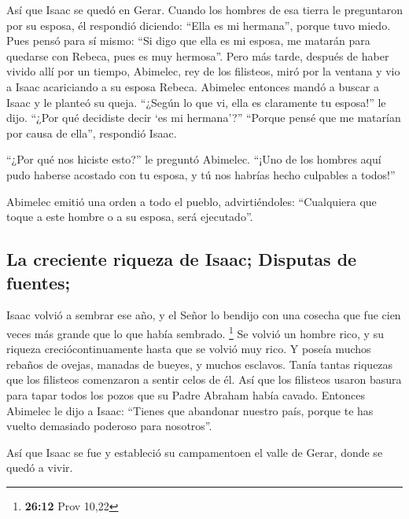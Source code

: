  Así que Isaac se quedó en Gerar.  Cuando
los hombres de esa tierra le preguntaron por su esposa, él respondió
diciendo: ``Ella es mi hermana'', porque tuvo miedo. Pues pensó para sí
mismo: ``Si digo que ella es mi esposa, me matarán para quedarse con
Rebeca, pues es muy hermosa''.  Pero más tarde, después de
haber vivido allí por un tiempo, Abimelec, rey de los filisteos, miró
por la ventana y vio a Isaac acariciando a su esposa Rebeca.
 Abimelec entonces mandó a buscar a Isaac y le planteó su
queja. ``¿Según lo que vi, ella es claramente tu esposa!'' le dijo.
``¿Por qué decidiste decir `es mi hermana'?'' ``Porque pensé que me
matarían por causa de ella'', respondió Isaac.

 ``¿Por qué nos hiciste esto?'' le preguntó Abimelec.
``¡Uno de los hombres aquí pudo haberse acostado con tu esposa, y tú nos
habrías hecho culpables a todos!''

 Abimelec emitió una orden a todo el pueblo,
advirtiéndoles: ``Cualquiera que toque a este hombre o a su esposa, será
ejecutado''.

\hypertarget{la-creciente-riqueza-de-isaac-disputas-de-fuentes}{%
\subsection{La creciente riqueza de Isaac; Disputas de
fuentes;}\label{la-creciente-riqueza-de-isaac-disputas-de-fuentes}}

 Isaac volvió a sembrar ese año, y el Señor lo bendijo
con una cosecha que fue cien veces más grande que lo que había sembrado.
\footnote{\textbf{26:12} Prov 10,22}  Se volvió un hombre
rico, y su riqueza creciócontinuamente hasta que se volvió muy rico.
 Y poseía muchos rebaños de ovejas, manadas de bueyes, y
muchos esclavos. Tanía tantas riquezas que los filisteos comenzaron a
sentir celos de él.  Así que los filisteos usaron basura
para tapar todos los pozos que su Padre Abraham había cavado.
 Entonces Abimelec le dijo a Isaac: ``Tienes que
abandonar nuestro país, porque te has vuelto demasiado poderoso para
nosotros''.

 Así que Isaac se fue y estableció su campamentoen el
valle de Gerar, donde se quedó a vivir.

